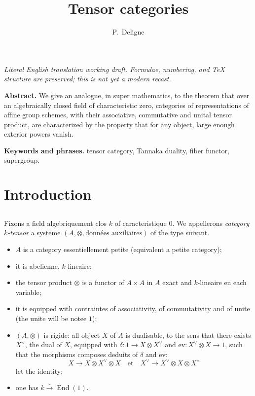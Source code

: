 \documentclass[11pt,a4paper]{article}
\title{Tensor categories}
\author{P.~Deligne}
\date{}
\theoremstyle{plain}
\theoremstyle{definition}
\DeclareMathOperator{\End}{End}
\newcommand{\ev}{\mathrm{ev}}
\begin{document}
\begin{center}\small\emph{Literal English translation working draft. Formulae, numbering, and TeX structure are preserved; this is not yet a modern recast.}\end{center}
\vspace{0.5em}

\maketitle

\noindent\textbf{Abstract.}
We give an analogue, in super mathematics, to the theorem that over an algebraically closed field of characteristic zero, categories of representations of affine group schemes, with their associative, commutative and unital tensor product, are characterized by the property that for any object, large enough exterior powers vanish.

\smallskip
\noindent\textbf{Keywords and phrases.} tensor category, Tannaka duality, fiber functor, supergroup.

\tableofcontents
\section{Introduction}

\subsection{}
\label{0.1}

Fixons a field algebriquement clos $k$ of caracteristique $0$. We appellerons \emph{category $k$-tensor} a systeme $(A,\otimes,\text{donn\'ees auxiliaires})$ of the type suivant.

\begin{itemize}
\item[(0.1.1)] $A$ is a category essentiellement petite (equivalent a petite category);
\item[(0.1.2)] it is abelienne, $k$-lineaire;
\item[(0.1.3)] the tensor product $\otimes$ is a functor of $A\times A$ in $A$ exact and $k$-lineaire en each variable;
\item[(0.1.4)] it is equipped with contraintes of associativity, of commutativity and of unite (the unite will be notee $1$);
\item[(0.1.5)] $(A,\otimes)$ is rigide: all object $X$ of $A$ is dualisable, to the sens that there exists $X^\vee$, the dual of $X$, equipped with $\delta:1\to X\otimes X^\vee$ and $\ev:X^\vee\otimes X\to 1$, such that the morphisms composes deduits of $\delta$ and $\ev$:
\[
X\to X\otimes X^\vee\otimes X\quad\text{et}\quad X^\vee\to X^\vee\otimes X\otimes X^\vee
\]
let the identity;
\item[(0.1.6)] one has $k\xrightarrow{\sim}\End(1)$.
\end{itemize}
\end{document}
